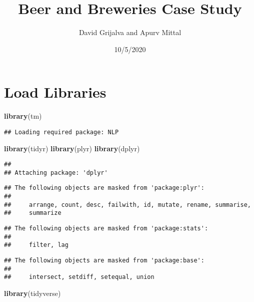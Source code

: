 \documentclass[]{article}
\title{Beer and Breweries Case Study}
\author{David Grijalva and Apurv Mittal}
\date{10/5/2020}
\newenvironment{Shaded}{\begin{snugshade}}{\end{snugshade}}
\newcommand{\KeywordTok}[1]{\textcolor[rgb]{0.13,0.29,0.53}{\textbf{#1}}}
\newcommand{\NormalTok}[1]{#1}
\begin{document}
\maketitle

\hypertarget{load-libraries}{%
\section{Load Libraries}\label{load-libraries}}

\begin{Shaded}
\begin{Highlighting}[]
\KeywordTok{library}\NormalTok{(tm) }
\end{Highlighting}
\end{Shaded}

\begin{verbatim}
## Loading required package: NLP
\end{verbatim}

\begin{Shaded}
\begin{Highlighting}[]
\KeywordTok{library}\NormalTok{(tidyr)}
\KeywordTok{library}\NormalTok{(plyr)}
\KeywordTok{library}\NormalTok{(dplyr)}
\end{Highlighting}
\end{Shaded}

\begin{verbatim}
## 
## Attaching package: 'dplyr'
\end{verbatim}

\begin{verbatim}
## The following objects are masked from 'package:plyr':
## 
##     arrange, count, desc, failwith, id, mutate, rename, summarise,
##     summarize
\end{verbatim}

\begin{verbatim}
## The following objects are masked from 'package:stats':
## 
##     filter, lag
\end{verbatim}

\begin{verbatim}
## The following objects are masked from 'package:base':
## 
##     intersect, setdiff, setequal, union
\end{verbatim}

\begin{Shaded}
\begin{Highlighting}[]
\KeywordTok{library}\NormalTok{(tidyverse)}
\end{Highlighting}
\end{Shaded}
\end{document}

